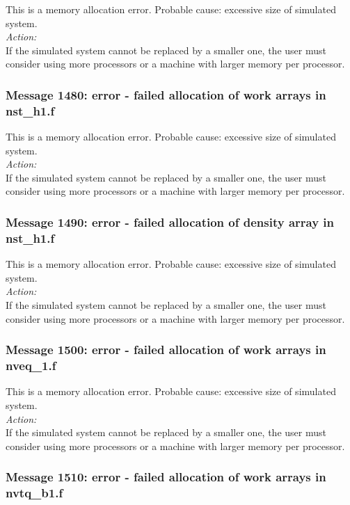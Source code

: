 This is a memory allocation error. Probable cause: excessive size of
simulated system. \\

\noindent
{\em Action:}\\
If the simulated system cannot be replaced by a smaller one, the user
must consider using more processors or a machine with larger memory
per processor.

\subsubsection*{Message 1480: error - failed allocation of work arrays
in nst\_h1.f}

This is a memory allocation error. Probable cause: excessive size of
simulated system. \\

\noindent
{\em Action:}\\
If the simulated system cannot be replaced by a smaller one, the user
must consider using more processors or a machine with larger memory
per processor.

\subsubsection*{Message 1490: error - failed allocation of density
array in nst\_h1.f}

This is a memory allocation error. Probable cause: excessive size of
simulated system. \\

\noindent
{\em Action:}\\
If the simulated system cannot be replaced by a smaller one, the user
must consider using more processors or a machine with larger memory
per processor.

\subsubsection*{Message 1500: error - failed allocation of work arrays
in nveq\_1.f}

This is a memory allocation error. Probable cause: excessive size of
simulated system. \\

\noindent
{\em Action:}\\
If the simulated system cannot be replaced by a smaller one, the user
must consider using more processors or a machine with larger memory
per processor.

\subsubsection*{Message 1510: error - failed allocation of work arrays
in nvtq\_b1.f}

